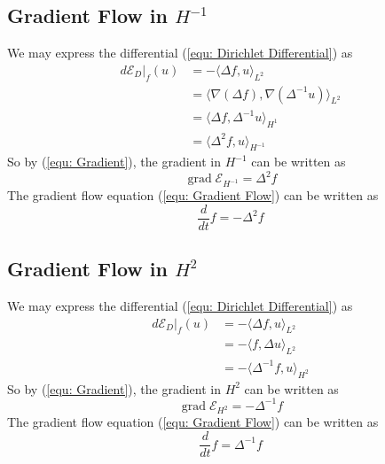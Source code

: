 \documentclass[a4paper]{article}
\theoremstyle{definition}
\DeclareMathOperator{\grad}{grad}
\begin{document}
\subsection{Gradient Flow in $H^{-1}$}
We may express the differential (\ref{equ: Dirichlet Differential}) as
\begin{align}
    d \mathcal{E}_D|_f (u) &= - \langle \Delta f, u \rangle_{L^2} \\
    &= \langle \nabla \left( \Delta f \right), \nabla \left( \Delta^{-1} u \right) \rangle_{L^2} \\
    &= \langle \Delta f, \Delta^{-1} u \rangle_{H^1} \\
    &= \langle \Delta^2 f, u \rangle_{H^{-1}}
    \label{equ: Gradient H-1 Derivation}
\end{align}
So by (\ref{equ: Gradient}), the gradient in $H^{-1}$ can be written as
\begin{equation}
    \grad \mathcal{E}_{H^{-1}} = \Delta^2 f
    \label{equ: H-1 Gradient}
\end{equation}
The gradient flow equation (\ref{equ: Gradient Flow}) can be written as
\begin{equation}
    \frac{d}{dt}f = - \Delta^2 f
    \label{equ: H-1 Gradient Flow}
\end{equation}

\subsection{Gradient Flow in $H^2$}
We may express the differential (\ref{equ: Dirichlet Differential}) as
\begin{align}
    d \mathcal{E}_D|_f (u) &= - \langle \Delta f, u \rangle_{L^2} \\
    &= -\langle f, \Delta u \rangle_{L^{2}} \\
    &= -\langle \Delta^{-1} f, u \rangle_{H^2}
    \label{equ: Gradient H2 Derivation}
\end{align}
So by (\ref{equ: Gradient}), the gradient in $H^2$ can be written as
\begin{equation}
    \grad \mathcal{E}_{H^2} = - \Delta^{-1} f
    \label{equ: H2 Gradient}
\end{equation}
The gradient flow equation (\ref{equ: Gradient Flow}) can be written as
\begin{equation}
    \frac{d}{dt}f = \Delta^{-1} f
    \label{equ: H2 Gradient Flow}
\end{equation}
\end{document}
